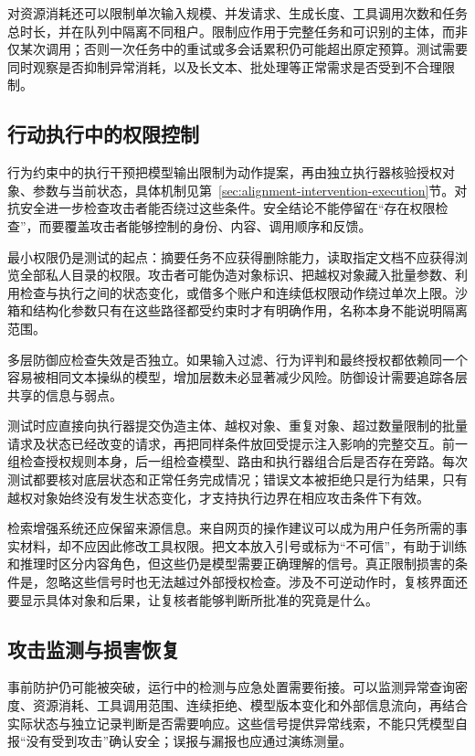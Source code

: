 对资源消耗还可以限制单次输入规模、并发请求、生成长度、工具调用次数和任务总时长，并在队列中隔离不同租户。限制应作用于完整任务和可识别的主体，而非仅某次调用；否则一次任务中的重试或多会话累积仍可能超出原定预算。测试需要同时观察是否抑制异常消耗，以及长文本、批处理等正常需求是否受到不合理限制。

\subsection{行动执行中的权限控制}
\label{sec:security-execution-defense}

行为约束中的执行干预把模型输出限制为动作提案，再由独立执行器核验授权对象、参数与当前状态，具体机制见第~\ref{sec:alignment-intervention-execution}节。对抗安全进一步检查攻击者能否绕过这些条件。安全结论不能停留在“存在权限检查”，而要覆盖攻击者能够控制的身份、内容、调用顺序和反馈。

最小权限仍是测试的起点：摘要任务不应获得删除能力，读取指定文档不应获得浏览全部私人目录的权限。攻击者可能伪造对象标识、把越权对象藏入批量参数、利用检查与执行之间的状态变化，或借多个账户和连续低权限动作绕过单次上限。沙箱和结构化参数只有在这些路径都受约束时才有明确作用，名称本身不能说明隔离范围。

多层防御应检查失效是否独立。如果输入过滤、行为评判和最终授权都依赖同一个容易被相同文本操纵的模型，增加层数未必显著减少风险。防御设计需要追踪各层共享的信息与弱点。

测试时应直接向执行器提交伪造主体、越权对象、重复对象、超过数量限制的批量请求及状态已经改变的请求，再把同样条件放回受提示注入影响的完整交互。前一组检查授权规则本身，后一组检查模型、路由和执行器组合后是否存在旁路。每次测试都要核对底层状态和正常任务完成情况；错误文本被拒绝只是行为结果，只有越权对象始终没有发生状态变化，才支持执行边界在相应攻击条件下有效。

检索增强系统还应保留来源信息。来自网页的操作建议可以成为用户任务所需的事实材料，却不应因此修改工具权限。把文本放入引号或标为“不可信”，有助于训练和推理时区分内容角色，但这些仍是模型需要正确理解的信号。真正限制损害的条件是，忽略这些信号时也无法越过外部授权检查。涉及不可逆动作时，复核界面还要显示具体对象和后果，让复核者能够判断所批准的究竟是什么。

\subsection{攻击监测与损害恢复}
\label{sec:security-recovery}

事前防护仍可能被突破，运行中的检测与应急处置需要衔接。可以监测异常查询密度、资源消耗、工具调用范围、连续拒绝、模型版本变化和外部信息流向，再结合实际状态与独立记录判断是否需要响应。这些信号提供异常线索，不能只凭模型自报“没有受到攻击”确认安全；误报与漏报也应通过演练测量。


